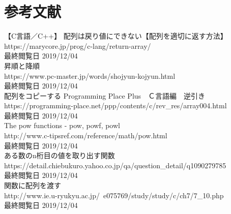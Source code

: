 

\section{参考文献}
【C言語／C++】 配列は戻り値にできない【配列を適切に返す方法】 \\
https://marycore.jp/prog/c-lang/return-array/ \\
最終閲覧日 2019/12/04　\\


昇順と降順 \\
https://www.pc-master.jp/words/shojyun-kojyun.html \\
最終閲覧日 2019/12/04 \\

配列をコピーする Programming Place Plus　Ｃ言語編　逆引き \\
https://programming-place.net/ppp/contents/c/rev\_res/array004.html \\
最終閲覧日 2019/12/04 \\

The pow functions - pow, powf, powl \\
http://www.c-tipsref.com/reference/math/pow.html \\
最終閲覧日 2019/12/04 \\

ある数のn桁目の値を取り出す関数 \\
https://detail.chiebukuro.yahoo.co.jp/qa/question\_detail/q1090279785 \\
最終閲覧日 2019/12/04 \\

関数に配列を渡す \\
http://www.ie.u-ryukyu.ac.jp/~e075769/study/study/c/ch7/7\_10.php \\
最終閲覧日 2019/12/04

